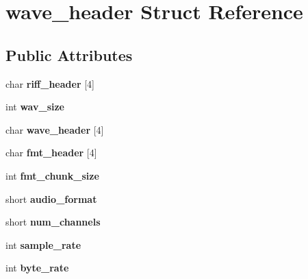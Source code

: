 \hypertarget{structwave__header}{}\section{wave\+\_\+header Struct Reference}
\label{structwave__header}
\subsection*{Public Attributes}
\begin{DoxyCompactItemize}
\item 
\mbox{\label{structwave__header_a4ee8111114d0231a19b027a5b6f0a2c4}} 
char {\bfseries riff\+\_\+header} \mbox{[}4\mbox{]}
\item 
\mbox{\label{structwave__header_a18cf8fe310ceef6f0ccf9924f777345d}} 
int {\bfseries wav\+\_\+size}
\item 
\mbox{\label{structwave__header_a68a18b6e4580d70d7a3aa50162ecfa10}} 
char {\bfseries wave\+\_\+header} \mbox{[}4\mbox{]}
\item 
\mbox{\label{structwave__header_a4fd8c2011b9d687d5c9cf7743c2d3e60}} 
char {\bfseries fmt\+\_\+header} \mbox{[}4\mbox{]}
\item 
\mbox{\label{structwave__header_a15d7c9ec3e1268c0bad0d701898ef5aa}} 
int {\bfseries fmt\+\_\+chunk\+\_\+size}
\item 
\mbox{\label{structwave__header_a6bc736a3480725808cf719b5f50c9053}} 
short {\bfseries audio\+\_\+format}
\item 
\mbox{\label{structwave__header_a2aae44f75630f18d977113953e779677}} 
short {\bfseries num\+\_\+channels}
\item 
\mbox{\label{structwave__header_ab3c647a31065080385378bf9cbb89d0b}} 
int {\bfseries sample\+\_\+rate}
\item 
\mbox{\label{structwave__header_a8c9c8b8998a353119ca3d4f797a2eb16}} 
int {\bfseries byte\+\_\+rate}
\item 

\end{DoxyCompactItemize}
